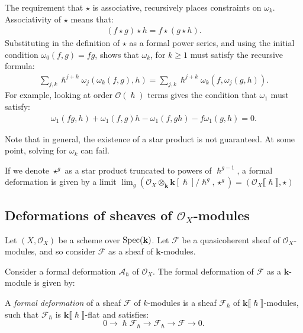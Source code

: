     The requirement that \( \star \) is associative, recursively places constraints on \( \omega_k\). Associativity of \( \star\) means that:
    \begin{align*}
        (f \star g) \star h = f \star (g \star h).
    \end{align*}
    Substituting in the definition of \( \star\) as a formal power series, and using the initial condition \( \omega_{0}(f,g) = fg\), shows that \( \omega_k\), for \( k \geq 1\) must satisfy the recursive formula: 
    \begin{align}
        \sum_{j,k} \hslash^{j+k} \omega_j (\omega_k ( f ,g ),h) = \sum_{j,k} \hslash^{j+k} \omega_k(f,\omega_j(g,h)).
    \end{align}
    For example, looking at order \( \mathcal{O}(\hslash)\) terms gives the condition that \( \omega_1\) must satisfy:
    \begin{align*}
    \omega_{1}(f g, h)  +  \omega_1(f,g) h  - \omega_{1}(f, g h)  - f \omega_{1}(g,h) = 0.
    \end{align*}    
    \begin{rem} Note that in general, the existence of a star product is not guaranteed. At some point, solving for \( \omega_k\) can fail.
    \end{rem}
    
    If we denote \( \star^{g}\) as a star product truncated to powers of \(\hslash^{g-1}\), a formal deformation is given by a limit 
    \( \lim_g (\mathcal{O}_X \otimes_{\mathbf{k}} \mathbf{k}[\hslash]/\hslash^g, \star^g) = (\mathcal{O}_X \lBrack \hslash \rBrack, \star ) \)
    
    

    \subsection{Deformations of sheaves of \texorpdfstring{\(\mathcal{O}_X\)}{O\_X}-modules } 
    
    Let \((X,\mathcal{O}_X)\) be a scheme over \( \mathrm{Spec}(\mathbf{k})\). Let \( \mathcal{F}\) be a quasicoherent sheaf of \( \mathcal{O}_X\)-modules, and so consider \( \mathcal{F}\) as a sheaf of \( \mathbf{k}\)-modules.
    
    Consider a formal deformation \( \mathcal{A}_{\hslash}\) of \(\mathcal{O}_X\). The formal deformation of \( \mathcal{F}\) as a \( \mathbf{k}\)-module is given by:
    \begin{defn}
    A \emph{formal deformation} of a sheaf \( \mathcal{F}\) of \( k\)-modules is a sheaf \( \mathcal{F}_{\hslash} \) of \( \mathbf{k}\lBrack\hslash\rBrack\)-modules, such that \( \mathcal{F}_{\hslash}\) 
    is \(\mathbf{k}\lBrack\hslash\rBrack \)-flat and satisfies: 
    \[ 0 \rightarrow \hslash \mathcal{F}_{\hslash} \rightarrow  \mathcal{F}_{\hslash} \rightarrow \mathcal{F}  \rightarrow 0.\]
    \end{defn}
    
